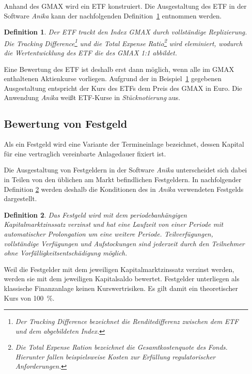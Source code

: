 \documentclass[12pt, a4paper]{article}
\theoremstyle{plain}
\newtheorem{definition}{Definition}
\begin{document}
 Anhand des \gls{GMAX} wird ein \gls{ETF} konstruiert. Die Ausgestaltung des \gls{ETF} in der Software \textit{Anika} kann der nachfolgenden Definition~\ref{def:etf} entnommen werden.
\begin{definition}
	\label{def:etf}
	Der \gls{ETF} trackt den Index \gls{GMAX} durch vollständige Replizierung. Die \textit{Tracking Difference}\footnote{Der \textit{Tracking Difference} bezeichnet die Renditedifferenz zwischen dem \gls{ETF} und dem abgebildeten Index.} und die \textit{Total Expense Ratio}\footnote{Die \textit{Total Expense Ration} bezeichnet die Gesamtkostenquote des Fonds. Hierunter fallen beispielsweise Kosten zur Erfüllung regulatorischer Anforderungen.} wird eleminiert, wodurch die Wertentwicklung des \gls{ETF} die des \gls{GMAX} 1:1 abbildet.
\end{definition}

Eine Bewertung des \gls{ETF} ist deshalb erst dann möglich, wenn alle im \gls{GMAX} enthaltenen Aktienkurse vorliegen. Aufgrund der in Beispiel~\ref{def:etf} gegebenen Ausgestaltung entspricht der Kurs des \glspl{ETF} dem Preis des \gls{GMAX} in Euro. 
Die Anwendung \textit{Anika} weißt \gls{ETF}-Kurse in \textit{Stücknotierung} aus.

\subsection{Bewertung von Festgeld}
\label{sec:bewertung_von_festgeldern}

Als ein Festgeld wird eine Variante der Termineinlage bezeichnet, dessen Kapital für eine vertraglich vereinbarte Anlagedauer fixiert ist.

Die Ausgestaltung von Festgeldern in der Software \textit{Anika} unterscheidet sich dabei in Teilen von den üblichen am Markt befindlichen Festgeldern. In nachfolgender Definition \ref{def:festgeld} werden deshalb die Konditionen des in \textit{Anika} verwendeten Festgelds dargestellt.

\begin{definition}
	\label{def:festgeld}
	Das Festgeld wird mit dem periodebanhängigen Kapitalmarktzinssatz verzinst und hat eine Laufzeit von einer Periode mit automatischer Prolongation um eine weitere Periode. Teilverfügungen, vollständige Verfügungen und Aufstockungen sind jederzeit durch den Teilnehmer ohne Vorfälligkeitsentschädigung möglich. 
\end{definition}

Weil die Festgelder mit dem jeweiligen Kapitalmarktzinssatz verzinst werden, werden sie mit dem jeweiligen Kapitalsaldo bewertet. 
Festgelder unterliegen als klassische Finanzanlage keinen Kurswertrisiken. Es gilt damit ein theoretischer Kurs von 100~\%.
\end{document}
